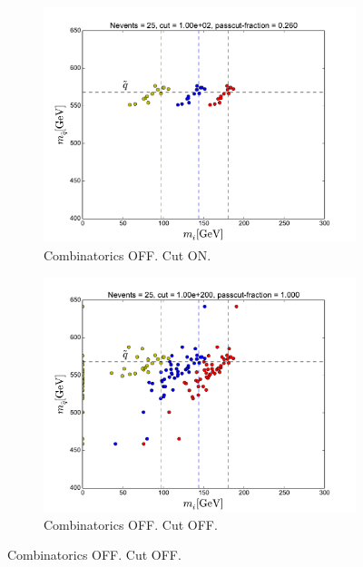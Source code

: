 \documentclass[twoside,english]{uiofysmaster}
\begin{document}
\begin{figure}[hbt]
	\centering
	\begin{subfigure}[b]{0.49\textwidth}
		\includegraphics[width=\textwidth]{figures/making-sense/pythia_noIFSR_combinatorics-OFF_cut-100.pdf} 
		\caption{Combinatorics OFF. Cut ON.}
	\end{subfigure}
	\begin{subfigure}[b]{0.49\textwidth}
		\includegraphics[width=\textwidth]{figures/making-sense/pythia_noIFSR_combinatorics-OFF_nocut.pdf} 
		\caption{Combinatorics OFF. Cut OFF. }
	\end{subfigure}


\end{figure}
\end{document}
